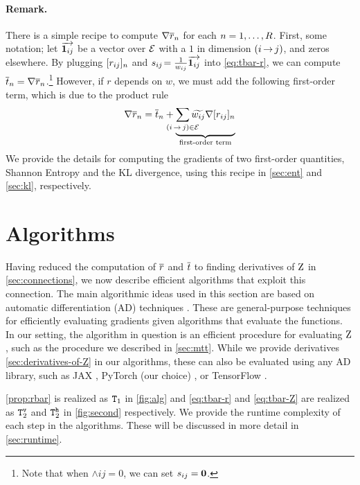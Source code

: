 \documentclass[11pt,a4paper]{article}
\theoremstyle{definition}
\begin{document}
\paragraph{Remark.} There is a simple recipe to compute
${\nabla {\overline{r}}_n}$ for each $n=1,\dots,{R}$.
First, some notation; let ${\overrightarrow{\boldsymbol{1}_{ij}}}$ be a vector over ${\mathcal{E}}$ with a $1$ in dimension ${(i\,{\rightarrow}\,j)}$, and zeros elsewhere.
By plugging $[{r_{ij}}]_n$ and  ${s_{ij}}\!=\frac{1}{{w_{ij}}}{\overrightarrow{\boldsymbol{1}_{ij}}}$ into \cref{eq:tbar-r}, 
we can compute ${\overline{t}}_n = {\nabla {\overline{r}}_n}$.\footnote{Note that when $\wedge{ij}=0$, we can set ${s_{ij}}=\boldsymbol 0$.}
However, if $r$ depends on $w$, we must add the following first-order term, which is due to the product rule
\begin{equation}\label{eq:nablabar}
    \nabla \rbar_n = \tbar_{n} + \underbrace{\smashoperator{\sum_{\edgeij\in\edges}}\totalw{ij}\nabla[\redge{ij}]_n}_{\text{first-order term}}
\end{equation}
We provide the details for computing the gradients of two first-order quantities, Shannon Entropy and the KL divergence, 
using this recipe in \cref{sec:ent} and \cref{sec:kl}, respectively.

\section{Algorithms}\label{sec:algs}
Having reduced the computation of ${\overline{r}}$ and ${\overline{t}}$ to finding derivatives of ${\mathrm{Z}}$ in \cref{sec:connections}, we now describe efficient algorithms that exploit this connection.
The main algorithmic ideas used in this section are based on automatic differentiation (AD) techniques \citep{griewank-walther}.
These are general-purpose techniques for efficiently evaluating gradients given algorithms that evaluate the functions.
In our setting, the algorithm in question is an efficient procedure for evaluating ${\mathrm{Z}}$, such as the procedure we described in \cref{sec:mtt}.
While we provide derivatives \cref{sec:derivatives-of-Z} in our algorithms, these can also be evaluated using any AD library, such as JAX \citep{jax}, PyTorch (our choice) \citep{pytorch}, or TensorFlow \citep{tensorflow}.

\cref{prop:rbar} is realized as $\texttt{T}_1$ in \cref{fig:alg} and \cref{eq:tbar-r} and \cref{eq:tbar-Z} are realized as $\texttt{T}_2^{\texttt{v}}$ and $\texttt{T}_2^{\texttt{h}}$ in \cref{fig:second} respectively.
We provide the runtime complexity of each step in the algorithms. These will be discussed in more detail in \cref{sec:runtime}.
\end{document}

